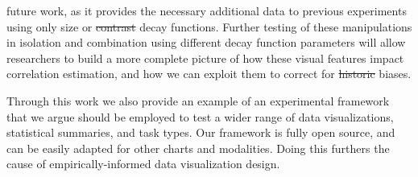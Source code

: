 \documentclass[manuscript, review, anonymous, screen]{acmart}
\providecommand{\DIFaddtex}[1]{{\protect\color{blue}\uwave{#1}}} %
\providecommand{\DIFdeltex}[1]{{\protect\color{red}\sout{#1}}}                      %
\providecommand{\DIFaddbegin}{} %
\providecommand{\DIFaddend}{} %
\providecommand{\DIFdelbegin}{} %
\providecommand{\DIFdelend}{} %
\providecommand{\DIFadd}[1]{\texorpdfstring{\DIFaddtex{#1}}{#1}} %
\providecommand{\DIFdel}[1]{\texorpdfstring{\DIFdeltex{#1}}{}} %
\newcommand{\DIFscaledelfig}{0.5}
\newlength{\DIFdelgraphicswidth} %
\newlength{\DIFdelgraphicsheight} %
\newcommand{\DIFaddincludegraphics}[2][]{{\color{blue}\fbox{\DIFOincludegraphics[#1]{#2}}}} %
\newcommand{\DIFdelincludegraphics}[2][]{%
\sbox{\DIFdelgraphicsbox}{\DIFOincludegraphics[#1]{#2}}%
\settoboxwidth{\DIFdelgraphicswidth}{\DIFdelgraphicsbox} %
\settoboxtotalheight{\DIFdelgraphicsheight}{\DIFdelgraphicsbox} %
\scalebox{\DIFscaledelfig}{%
\parbox[b]{\DIFdelgraphicswidth}{\usebox{\DIFdelgraphicsbox}\\[-\baselineskip] \rule{\DIFdelgraphicswidth}{0em}}\llap{\resizebox{\DIFdelgraphicswidth}{\DIFdelgraphicsheight}{%
\setlength{\unitlength}{\DIFdelgraphicswidth}%
\begin{picture}(1,1)%
\thicklines\linethickness{2pt} %
{\color[rgb]{1,0,0}\put(0,0){\framebox(1,1){}}}%
{\color[rgb]{1,0,0}\put(0,0){\line( 1,1){1}}}%
{\color[rgb]{1,0,0}\put(0,1){\line(1,-1){1}}}%
\end{picture}%
}\hspace*{3pt}}} %
} %
\DeclareRobustCommand{\DIFaddbegin}{\DIFOaddbegin \let\includegraphics\DIFaddincludegraphics} %
\DeclareRobustCommand{\DIFaddend}{\DIFOaddend \let\includegraphics\DIFOincludegraphics} %
\DeclareRobustCommand{\DIFdelbegin}{\DIFOdelbegin \let\includegraphics\DIFdelincludegraphics} %
\DeclareRobustCommand{\DIFdelend}{\DIFOaddend \let\includegraphics\DIFOincludegraphics} %
\begin{document}
future work, as it provides the necessary additional data to previous
experiments using only size \citep{strain_2023b} or \DIFdelbegin \DIFdel{contrast }\DIFdelend \DIFaddbegin \DIFadd{opacity
}\DIFaddend \citep{strain_2023} decay functions. Further testing of these
manipulations in isolation and combination using different decay
function parameters will allow researchers to build a more complete
picture of how these visual features impact correlation estimation, and
how we can exploit them to correct for \DIFdelbegin \DIFdel{historic }\DIFdelend \DIFaddbegin \DIFadd{well-known }\DIFaddend biases.

Through this work we also provide an example of an experimental
framework that we argue should be employed to test a wider range of data
visualizations, statistical summaries, and task types. Our framework is
fully open source, and can be easily adapted for other charts and
modalities. Doing this furthers the cause of empirically-informed data
visualization design.




\end{document}
